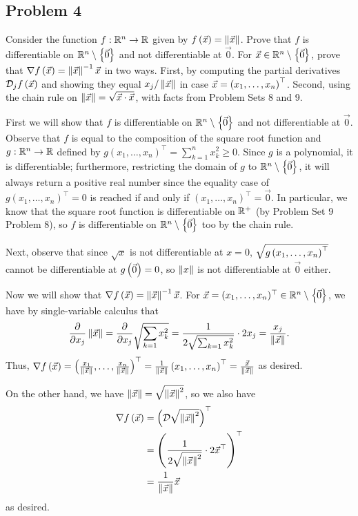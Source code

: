 \documentclass[main.tex]{subfiles}
\begin{document}
\subsection{Problem 4}
\begin{claim}
    Consider the function $f : \mathbb R^n \to \mathbb R$ given by $f\left( \vec{x} \right) = \left\lVert \vec{x} \right\rVert$. Prove that $f$ is differentiable on $\mathbb R^n\setminus \left\{ \vec{0} \right\}$ and not differentiable at $\vec{0}$. For $\vec{x} \in \mathbb R^n\setminus\left\{ \vec{0} \right\}$, prove that $\nabla f\left( \vec{x} \right) = \left\lVert \vec{x} \right\rVert^{-1}\vec{x}$ in two ways. First, by computing the partial derivatives $\mathcal{D}_jf\left( \vec{x} \right)$ and showing they equal $x_j/\left\lVert \vec{x} \right\rVert$ in case $\vec{x} = \left( x_1,\ldots ,x_n \right)^\top$. Second, using the chain rule on $\left\lVert \vec{x} \right\rVert = \sqrt{\vec{x} \cdot \vec{x}}$, with facts from Problem Sets 8 and 9.
\end{claim}

\begin{soln}
    First we will show that $f$ is differentiable on $\mathbb R^n\setminus\left\{ \vec{0} \right\}$ and not differentiable at $\vec{0}$. Observe that $f$ is equal to the composition of the square root function and $g: \mathbb R^n \to \mathbb R$ defined by $g(x_1, \ldots , x_n)^\top = \sum_{k = 1}^n x_k^2 \ge 0$. Since $g$ is a polynomial, it is differentiable; furthermore, restricting the domain of $g$ to $\mathbb R^n\setminus\left\{ \vec{0} \right\}$, it will always return a positive real number since the equality case of $g(x_1, \ldots , x_n)^\top = 0$ is reached if and only if $(x_1, \ldots , x_n)^\top = \vec{0}$. In particular, we know that the square root function is differentiable on $\mathbb R^+$ (by Problem Set 9 Problem 8), so $f$ is differentiable on $\mathbb R^n\setminus \left\{ \vec{0} \right\}$ too by the chain rule.

    Next, observe that since $\sqrt{x}$ is not differentiable at $x = 0$, $\sqrt{g\left( x_1, \ldots , x_n \right)^\top}$ cannot be differentiable at $g\left( \vec{0} \right) = 0$, so $\left\lVert x \right\rVert$ is not differentiable at $\vec{0}$ either. 

    Now we will show that $\nabla f\left( \vec{x} \right) = \left\lVert \vec{x} \right\rVert^{-1}\vec{x}$. For $\vec{x} = (x_1, \ldots , x_n)^\top \in \mathbb R^n \setminus\left\{ \vec{0} \right\}$, we have by single-variable calculus that
    \[\pdv{}{x_j}\left\lVert \vec{x} \right\rVert = \pdv{}{x_j}\sqrt{\sum_{k = 1} x_k^2} = \frac{1}{2\sqrt{\sum_{k = 1} x_k^2}} \cdot 2x_j = \frac{x_j}{\left\lVert \vec{x} \right\rVert}.\]
    Thus, $\nabla f\left( \vec{x} \right) = \left( \frac{x_1}{\left\lVert \vec{x} \right\rVert}, \ldots , \frac{x_n}{\left\lVert \vec{x} \right\rVert} \right)^\top = \frac{1}{\left\lVert \vec{x} \right\rVert}\left( x_1, \ldots , x_n \right)^\top = \frac{\vec{x}}{\left\lVert \vec{x} \right\rVert}$ as desired.

    On the other hand, we have $\left\lVert \vec{x} \right\rVert = \sqrt{\left\lVert \vec{x} \right\rVert^2}$, so we also have
    \begin{align*}
        \nabla f\left( \vec{x} \right) &= \left( \mathcal{D}\sqrt{\left\lVert \vec{x} \right\rVert^2} \right)^\top \\
        &= \left( \frac{1}{2\sqrt{\left\lVert \vec{x} \right\rVert^2}}\cdot 2\vec{x}^\top \right)^\top \\
        &= \frac{1}{\left\lVert \vec{x} \right\rVert}\vec{x}
    \end{align*}
    as desired.
    
\end{soln}
\eject
\end{document}
